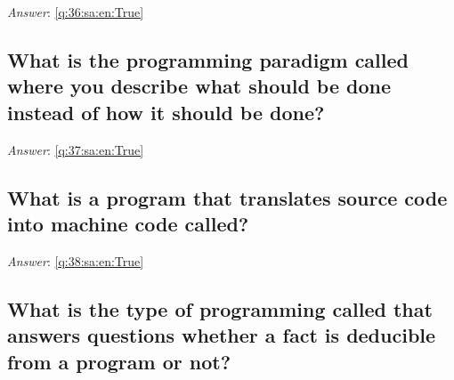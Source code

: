 \documentclass[a4paper,11pt,oneside]{article}
\begin{document}
\begin{sloppypar}
\label{q:36:sa:en:False}

\vspace{2cm}

\noindent\makebox[\textwidth]{\hrulefill}

\vspace{1cm}

\textit{Answer}: \autoref{q:36:sa:en:True}



\subsection{What is the programming paradigm called where you describe what should be done instead of how it should be done?}

\label{q:37:sa:en:False}

\vspace{2cm}

\noindent\makebox[\textwidth]{\hrulefill}

\vspace{1cm}

\textit{Answer}: \autoref{q:37:sa:en:True}



\subsection{What is a program that translates source code into machine code called?}

\label{q:38:sa:en:False}

\vspace{2cm}

\noindent\makebox[\textwidth]{\hrulefill}

\vspace{1cm}

\textit{Answer}: \autoref{q:38:sa:en:True}



\subsection{What is the type of programming called that answers questions whether a fact is deducible from a program or not?}

\label{q:39:sa:en:False}

\vspace{2cm}

\noindent\makebox[\textwidth]{\hrulefill}

\vspace{1cm}


\end{sloppypar}
\end{document}
